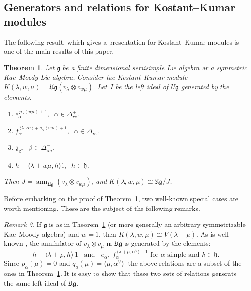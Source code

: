 \documentclass[12pt,reqno]{amsart}
\theoremstyle{plain}
\newtheorem{theorem}{Theorem}[section]
\theoremstyle{definition}
\theoremstyle{remark}
\newtheorem{rem}[theorem]{Remark}
\theoremstyle{plain}
\newcommand{\posreal}[1][+]{\Delta_{re}^{#1}}
\newcommand{\posimag}{\Delta_{im}^+}
\newcommand{\lie}{\mathfrak}
\DeclareMathOperator{\ann}{ann}
\begin{document}
\subsection{Generators and relations for Kostant--Kumar modules}\label{sec:mainthmgenrel}
The following result, which gives a presentation for Kostant--Kumar modules is one of the main results of this paper.

\begin{theorem}\label{thm:gen-rel}
    Let $\mathfrak{g}$ be a finite dimensional semisimple Lie algebra or a symmetric Kac--Moody Lie algebra. Consider the Kostant--Kumar module $K(\lambda,w,\mu)=\mathfrak{Ug} (v_\lambda\otimes v_{w\mu})$. Let $J$ be the left ideal of $U\mathfrak g$ generated by the elements:  
    \begin{enumerate}
        \item $e_\alpha^{\,p_\alpha (w\mu)+1}, \;\; \alpha \in \posreal$.
        \smallskip\item $f_\alpha^{\,\langle \lambda, \alpha^\vee \rangle + q_\alpha (w\mu)+1}, \;\; \alpha \in \posreal$.
        \smallskip\item ${\lie g}_\beta, \;\; \beta \in \posimag$.
        \smallskip\item $ h - \langle \lambda + w\mu, h \rangle 1, \;\; h \in \mathfrak{h}$.
    \end{enumerate}
    Then $J=\ann_{\,\mathfrak{Ug}} (v_\lambda \otimes v_{w\mu})$, and $K(\lambda, w, \mu) \cong \mathfrak{Ug}/J$.
\end{theorem}


Before embarking on the proof of Theorem~\ref{thm:gen-rel}, two well-known special cases are worth mentioning. These are the subject of the following remarks.
\begin{rem}\label{rem:hwtreprel}
If $\lie g$ is as in Theorem~\ref{thm:gen-rel} (or more generally an arbitrary symmetrizable Kac--Moody algebra) and $w=1$, then $K(\lambda,w,\mu) \cong V(\lambda+\mu)$. As is well-known \cite[Corollary 10.4]{Kac}, the annihilator of $v_\lambda \otimes v_\mu$ in $\lie{Ug}$ is generated by the elements:
\[ h - \langle \lambda+\mu, h \rangle \,1\;\; \text{ and } \;\;e_{\alpha}, \; f_{\alpha}^{\,\langle \lambda +\mu, \alpha^\vee \rangle + 1} \text{ for } \alpha \text{ simple and } h \in \lie h.\]
Since $p_\alpha(\mu)=0$ and $q_\alpha(\mu) = \langle \mu, \alpha^\vee \rangle$, the above relations are a subset of the ones in Theorem~\ref{thm:gen-rel}. It is easy to show that these two sets of relations generate the same left ideal of $\lie{Ug}$.
\end{rem}
\end{document}
